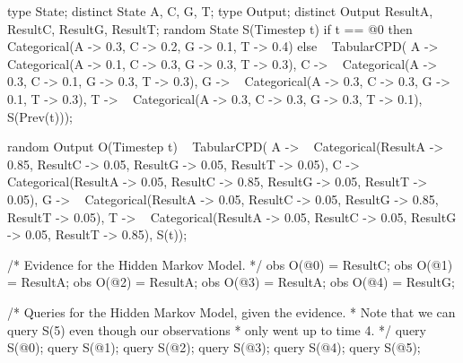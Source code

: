 \documentclass[12pt]{article}
\begin{document}
\begin{blogcode}
type State;
distinct State A, C, G, T;
type Output;
distinct Output ResultA, ResultC, ResultG, ResultT;
random State S(Timestep t)
  if t == @0 then 
    ~ Categorical({A -> 0.3, C -> 0.2, G -> 0.1, T -> 0.4})
  else ~ TabularCPD(
    {A -> ~ Categorical({A -> 0.1, C -> 0.3, G -> 0.3, T -> 0.3}),
     C -> ~ Categorical({A -> 0.3, C -> 0.1, G -> 0.3, T -> 0.3}),
     G -> ~ Categorical({A -> 0.3, C -> 0.3, G -> 0.1, T -> 0.3}),
     T -> ~ Categorical({A -> 0.3, C -> 0.3, G -> 0.3, T -> 0.1})},
    S(Prev(t)));

random Output O(Timestep t)
  ~ TabularCPD(
    {A -> ~ Categorical({ResultA -> 0.85, ResultC -> 0.05,
                         ResultG -> 0.05, ResultT -> 0.05}),
    C -> ~ Categorical({ResultA -> 0.05, ResultC -> 0.85, 
                        ResultG -> 0.05, ResultT -> 0.05}),
    G -> ~ Categorical({ResultA -> 0.05, ResultC -> 0.05, 
                        ResultG -> 0.85, ResultT -> 0.05}),
    T -> ~ Categorical({ResultA -> 0.05, ResultC -> 0.05, 
                        ResultG -> 0.05, ResultT -> 0.85})},
    S(t));

/* Evidence for the Hidden Markov Model.
 */
obs O(@0) = ResultC;
obs O(@1) = ResultA;
obs O(@2) = ResultA;
obs O(@3) = ResultA;
obs O(@4) = ResultG;

/* Queries for the Hidden Markov Model, given the evidence.  
 * Note that we can query S(5) even though our observations 
 * only went up to time 4.
 */
query S(@0);
query S(@1);
query S(@2);
query S(@3);
query S(@4);
query S(@5);
\end{blogcode}


\appendix
{}

\end{document}
